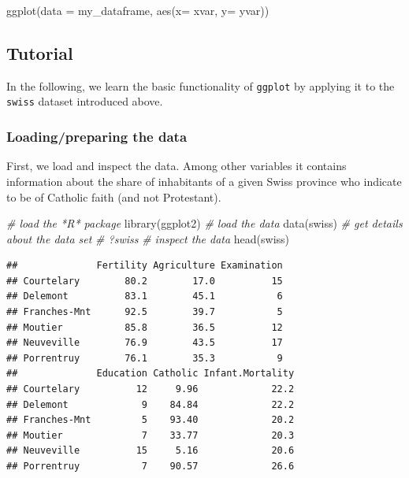 \documentclass[
  12pt,
]{style/krantz}
\newenvironment{Shaded}{\begin{snugshade}}{\end{snugshade}}
\newcommand{\AttributeTok}[1]{\textcolor[rgb]{0.77,0.63,0.00}{#1}}
\newcommand{\CommentTok}[1]{\textcolor[rgb]{0.56,0.35,0.01}{\textit{#1}}}
\newcommand{\FunctionTok}[1]{\textcolor[rgb]{0.00,0.00,0.00}{#1}}
\newcommand{\NormalTok}[1]{#1}
\begin{document}
\begin{Shaded}
\begin{Highlighting}[]
\FunctionTok{ggplot}\NormalTok{(}\AttributeTok{data =}\NormalTok{ my\_dataframe, }\FunctionTok{aes}\NormalTok{(}\AttributeTok{x=}\NormalTok{ xvar, }\AttributeTok{y=}\NormalTok{ yvar))}
\end{Highlighting}
\end{Shaded}

\hypertarget{tutorial}{%
\subsection{Tutorial}\label{tutorial}}

In the following, we learn the basic functionality of \texttt{ggplot} by applying it to the \texttt{swiss} dataset introduced above.

\hypertarget{loadingpreparing-the-data}{%
\subsubsection{Loading/preparing the data}\label{loadingpreparing-the-data}}

First, we load and inspect the data. Among other variables it contains information about the share of inhabitants of a given Swiss province who indicate to be of Catholic faith (and not Protestant).

\begin{Shaded}
\begin{Highlighting}[]
\CommentTok{\# load the *R* package}
\FunctionTok{library}\NormalTok{(ggplot2)}
\CommentTok{\# load the data}
\FunctionTok{data}\NormalTok{(swiss)}
\CommentTok{\# get details about the data set}
\CommentTok{\# ?swiss}
\CommentTok{\# inspect the data}
\FunctionTok{head}\NormalTok{(swiss)}
\end{Highlighting}
\end{Shaded}

\begin{verbatim}
##              Fertility Agriculture Examination
## Courtelary        80.2        17.0          15
## Delemont          83.1        45.1           6
## Franches-Mnt      92.5        39.7           5
## Moutier           85.8        36.5          12
## Neuveville        76.9        43.5          17
## Porrentruy        76.1        35.3           9
##              Education Catholic Infant.Mortality
## Courtelary          12     9.96             22.2
## Delemont             9    84.84             22.2
## Franches-Mnt         5    93.40             20.2
## Moutier              7    33.77             20.3
## Neuveville          15     5.16             20.6
## Porrentruy           7    90.57             26.6
\end{verbatim}
\end{document}
